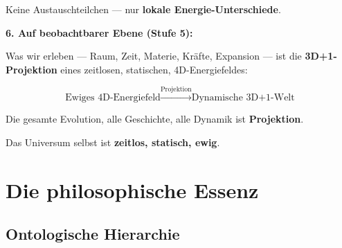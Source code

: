 \begin{revolutionary}
		Keine Austauschteilchen — nur \textbf{lokale Energie-Unterschiede}.
		
		\vspace{0.5cm}
		
		\textbf{6. Auf beobachtbarer Ebene (Stufe 5):}
		
		Was wir erleben — Raum, Zeit, Materie, Kräfte, Expansion — ist die \textbf{3D+1-Projektion} eines zeitlosen, statischen, 4D-Energiefeldes:
		
		\begin{equation}
			\text{Ewiges 4D-Energiefeld} \xrightarrow{\text{Projektion}} \text{Dynamische 3D+1-Welt}
		\end{equation}
		
		\vspace{0.3cm}
		
		Die gesamte Evolution, alle Geschichte, alle Dynamik ist \textbf{Projektion}.
		
		Das Universum selbst ist \textbf{zeitlos, statisch, ewig}.
	\end{revolutionary}
	
	\section{Die philosophische Essenz}
	
	\subsection{Ontologische Hierarchie}
	
